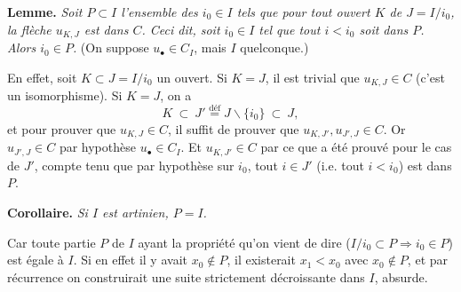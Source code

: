 \textbf{Lemme.} \textit{Soit $P \subset I$ l'ensemble des $i_0 \in I$ tels que pour tout ouvert $K$ de $J = I/i_0$, la flèche $u_{K,J}$ est dans $C$. Ceci dit, soit $i_0 \in I$ tel que tout $i < i_0$ soit dans $P$. Alors $i_0 \in P$.} (On suppose $u_\bullet \in C_I$, mais $I$ quelconque.)

En effet, soit $K \subset J = I/i_0$ un ouvert. Si $K = J$, il est trivial que $u_{K,J} \in C$ (c'est un isomorphisme). Si $K = J$, on a %
\[
K \ \subset\ J' \overset{\text{déf}}{=} J\backslash\{i_0\} \ \subset\ J,
\]
et pour prouver que $u_{K,J} \in C$, il suffit de prouver que $u_{K,J'}, u_{J',J} \in C$. Or $u_{J',J} \in C$ par hypothèse $u_\bullet \in C_I$. Et $u_{K,J'} \in C$ par ce que a été prouvé pour le cas de $J'$, compte tenu que par hypothèse sur $i_0$, tout $i \in J'$ (i.e. tout $i < i_0$) est dans $P$. %

\textbf{Corollaire.} \textit{Si $I$ est artinien, $P = I$.}

Car toute partie $P$ de $I$ ayant la propriété qu'on vient de dire ($I/i_0 \subset P \Longrightarrow i_0 \in P$) est égale à $I$. Si en effet il y avait $x_0 \notin P$, il existerait $x_1 < x_0$ avec $x_0 \notin P$, et par récurrence on construirait une suite strictement décroissante dans $I$, absurde. %


